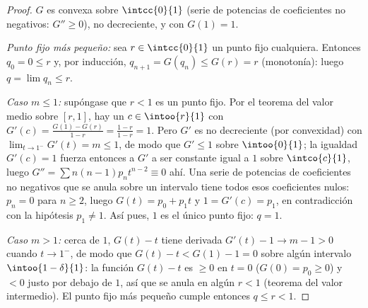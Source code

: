 \begin{proof}
$G$ es convexa sobre $\intcc{0}{1}$ (serie de potencias de
coeficientes no negativos: $G'' \geq 0$), no decreciente, y con $G(1)
= 1$.

\emph{Punto fijo más pequeño:} sea $r \in \intcc{0}{1}$ un punto fijo
cualquiera. Entonces $q_0 = 0 \leq r$ y, por inducción, $q_{n+1} =
G(q_n) \leq G(r) = r$ (monotonía): luego $q = \lim q_n \leq r$.

\emph{Caso $m \leq 1$:} supóngase que $r < 1$ es un punto fijo. Por
el teorema del valor medio sobre $[r, 1]$, hay un $c \in
\intoo{r}{1}$ con $G'(c) = \frac{G(1) - G(r)}{1 - r} = \frac{1 - r}{1
- r} = 1$. Pero $G'$ es no decreciente (por convexidad) con
$\lim_{t\to1^-}G'(t) = m \leq 1$, de modo que $G' \leq 1$ sobre
$\intoo{0}{1}$; la igualdad $G'(c) = 1$ fuerza entonces a $G'$ a ser
constante igual a $1$ sobre $\intco{c}{1}$, luego $G'' = \sum
n(n-1)p_nt^{n-2} \equiv 0$ ahí. Una serie de potencias de
coeficientes no negativos que se anula sobre un intervalo tiene todos
esos coeficientes nulos: $p_n = 0$ para $n \geq 2$, luego $G(t) = p_0
+ p_1t$ y $1 = G'(c) = p_1$, en contradicción con la hipótesis $p_1
\neq 1$. Así pues, $1$ es el único punto fijo: $q = 1$.

\emph{Caso $m > 1$:} cerca de $1$, $G(t) - t$ tiene derivada $G'(t) -
1 \to m - 1 > 0$ cuando $t \to 1^-$, de modo que $G(t) - t < G(1) - 1
= 0$ sobre algún intervalo $\intoo{1 - \delta}{1}$: la función
 $G(t) - t$ es $\geq 0$ en $t = 0$ ($G(0) = p_0 \geq 0$) y $<
0$ justo por debajo de $1$, así que se anula en algún $r < 1$
(teorema del valor intermedio). El punto fijo más pequeño cumple
entonces $q \leq r < 1$.
\end{proof}

